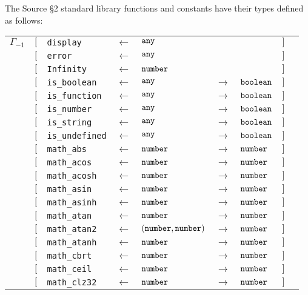 The Source \S 2 standard library functions and constants have their types defined as follows:

\begin{tabular}[fragile]{lllllllll}
$\Gamma_{-1}$
& $[$ & \texttt{display}      & $\leftarrow$  & $\texttt{any}$ & & & $]$ \\
& $[$ & \texttt{error}      & $\leftarrow$  & $\texttt{any}$ & & & $]$ \\
& $[$ & \texttt{Infinity}      & $\leftarrow$  & $\texttt{number}$ & & & $]$ \\
& $[$ & \texttt{is\_boolean}   & $\leftarrow$  & $\texttt{any}$ & $\rightarrow$ & $\texttt{boolean}$ & $]$ \\
& $[$ & \texttt{is\_function}  & $\leftarrow$  & $\texttt{any}$ & $\rightarrow$ & $\texttt{boolean}$ & $]$ \\
& $[$ & \texttt{is\_number}    & $\leftarrow$  & $\texttt{any}$ & $\rightarrow$ & $\texttt{boolean}$ & $]$ \\
& $[$ & \texttt{is\_string}    & $\leftarrow$  & $\texttt{any}$ & $\rightarrow$ & $\texttt{boolean}$ & $]$ \\
& $[$ & \texttt{is\_undefined} & $\leftarrow$  & $\texttt{any}$ & $\rightarrow$ & $\texttt{boolean}$ & $]$ \\
& $[$ & \texttt{math\_abs} & $\leftarrow$  & $\texttt{number}$ & $\rightarrow$ & $\texttt{number}$ & $]$ \\
& $[$ & \texttt{math\_acos} & $\leftarrow$  & $\texttt{number}$ & $\rightarrow$ & $\texttt{number}$ & $]$ \\
& $[$ & \texttt{math\_acosh} & $\leftarrow$  & $\texttt{number}$ & $\rightarrow$ & $\texttt{number}$ & $]$ \\
& $[$ & \texttt{math\_asin} & $\leftarrow$  & $\texttt{number}$ & $\rightarrow$ & $\texttt{number}$ & $]$ \\
& $[$ & \texttt{math\_asinh} & $\leftarrow$  & $\texttt{number}$ & $\rightarrow$ & $\texttt{number}$ & $]$ \\
& $[$ & \texttt{math\_atan} & $\leftarrow$  & $\texttt{number}$ & $\rightarrow$ & $\texttt{number}$ & $]$ \\
& $[$ & \texttt{math\_atan2} & $\leftarrow$  & $(\texttt{number}, \texttt{number})$ & $\rightarrow$ & $\texttt{number}$ & $]$ \\
& $[$ & \texttt{math\_atanh} & $\leftarrow$  & $\texttt{number}$ & $\rightarrow$ & $\texttt{number}$ & $]$ \\
& $[$ & \texttt{math\_cbrt} & $\leftarrow$  & $\texttt{number}$ & $\rightarrow$ & $\texttt{number}$ & $]$ \\
& $[$ & \texttt{math\_ceil} & $\leftarrow$  & $\texttt{number}$ & $\rightarrow$ & $\texttt{number}$ & $]$ \\
& $[$ & \texttt{math\_clz32} & $\leftarrow$  & $\texttt{number}$ & $\rightarrow$ & $\texttt{number}$ & $]$ \\

\end{tabular}
